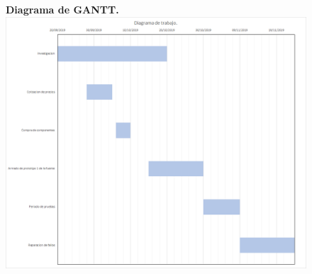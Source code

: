 \documentclass[letterpaper]{article}
\begin{document}
   
   \begin{LARGE}
   \begin{figure}[htbp]
        \textbf{Diagrama de GANTT.}\\
       \includegraphics[width=17cm]{Img/gantt.png}
 \end{figure}
   \end{LARGE}
   \newpage
\end{document}
